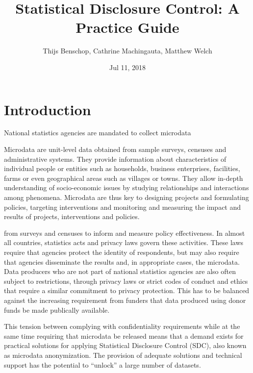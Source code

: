 \documentclass[letterpaper,10pt,english]{sphinxmanual}
\title{Statistical Disclosure Control: A Practice Guide}
\date{Jul 11, 2018}
\author{Thijs Benschop, Cathrine Machingauta, Matthew Welch}
\begin{document}
\maketitle
\sphinxtableofcontents
{}\label{\detokenize{index::doc}}



\chapter{Introduction}
\label{\detokenize{intro:introduction}}\label{\detokenize{intro:statistical-disclosure-control-for-microdata-a-practice-guide}}\label{\detokenize{intro::doc}}
National statistics agencies are mandated to collect
microdata %
\begin{footnote}[1]\sphinxAtStartFootnote
Microdata are unit-level data obtained from sample surveys, censuses
and administrative systems. They provide information about
characteristics of individual people or entities such as households,
business enterprises, facilities, farms or even geographical areas
such as villages or towns. They allow in-depth understanding of
socio-economic issues by studying relationships and interactions
among phenomena. Microdata are thus key to designing projects and
formulating policies, targeting interventions and monitoring and
measuring the impact and results of projects, interventions and
policies.
%
\end{footnote} from surveys and censuses to inform and
measure policy effectiveness. In almost all countries, statistics acts
and privacy laws govern these activities. These laws require that
agencies protect the identity of respondents, but may also require that
agencies disseminate the results and, in appropriate cases, the
microdata. Data producers who are not part of national statistics
agencies are also often subject to restrictions, through privacy laws or
strict codes of conduct and ethics that require a similar commitment to
privacy protection. This has to be balanced against the increasing
requirement from funders that data produced using donor funds be made
publically available.

This tension between complying with confidentiality requirements while
at the same time requiring that microdata be released means that a
demand exists for practical solutions for applying Statistical
Disclosure Control (SDC), also known as microdata anonymization. The
provision of adequate solutions and technical support has the potential
to “unlock” a large number of datasets.
\end{document}
